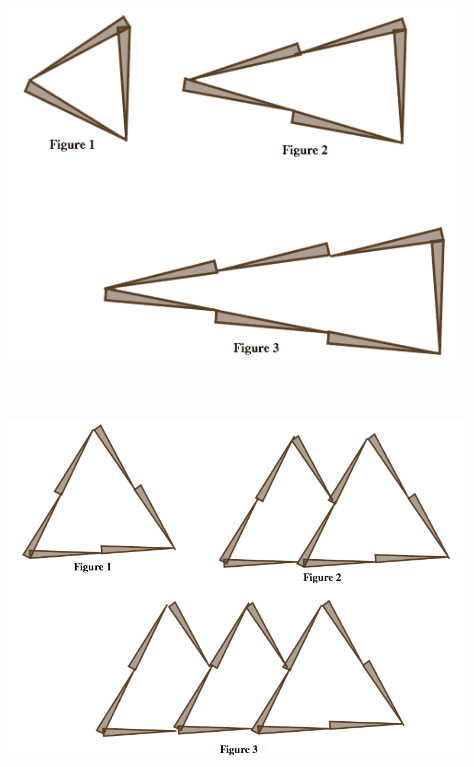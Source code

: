 \newpage

\begin{problem}\label{prob:toothpics2}\ 

\begin{center}
\includegraphics[height=9.5cm]{toothpicks2}
\end{center}

\end{problem}



\bigskip




\begin{problem}\label{prob:toothpics3}\ 

\begin{center}
\includegraphics[height=9cm]{toothpicks4}
\end{center}

\end{problem}


